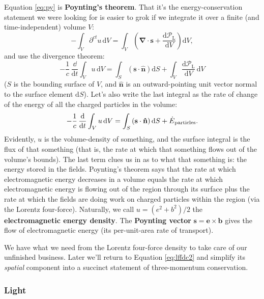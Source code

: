 \documentclass[12pt]{article}
\renewcommand{\vv}[1]{\mathbf{#1}}
\newcommand{\dd}[1]{\mathrm{d}#1}
\newcommand{\del}{\boldsymbol{\nabla}}
\begin{document}
Equation \ref{eq:py} is \textbf{Poynting's theorem}. That it's the energy-conservation statement we were looking for is easier to grok if we integrate it over a finite (and time-independent) volume $V$:
\begin{equation*}
- \int_V \partial^{ct} u \, \dd V = \int_V \left(  \del \cdot \vv s + \dfrac{\dd \mathcal{P}_{\textrm{L}}}{\dd V} \right) \dd V ,
\end{equation*}
and use the divergence theorem:
\begin{equation*}
- \dfrac{1}{c} \, \dfrac{\dd}{\dd t} \int_V u \, \dd V = \int_S \left( \vv s \cdot \vv{\hat{n}} \right) \dd S + \int_V \dfrac{\dd \mathcal{P}_{\textrm{L}}}{\dd V} \, \dd V
\end{equation*}
($S$ is the bounding surface of $V$, and $\vv{\hat{n}}$ is an outward-pointing unit vector normal to the surface element $\dd S$). Let's also write the last integral as the rate of change of the energy of all the charged particles in the volume:
\begin{equation*}
- \dfrac{1}{c} \, \dfrac{\dd}{\dd t} \int_V u \, \dd V = \int_S \left( \vv s \cdot \vv{\hat{n}} \right) \dd S + \dot{E}_{\mkern1mu \textrm{particles}} .
\end{equation*}
Evidently, $u$ is the volume-density of something, and the surface integral is the flux of that something (that is, the rate at which that something flows out of the volume's bounds). The last term clues us in as to what that something is: the energy stored in the fields. Poynting's theorem says that the rate at which electromagnetic energy decreases in a volume equals the rate at which electromagnetic energy is flowing out of the region through its surface plus the rate at which the fields are doing work on charged particles within the region (via the Lorentz four-force). Naturally, we call $u = (e^2 + b^2)/2$ the \textbf{electromagnetic energy density}. The \textbf{Poynting vector} $\vv s = \vv e \times \vv b$ gives the flow of electromagnetic energy (its per-unit-area rate of transport).

We have what we need from the Lorentz four-force density to take care of our unfinished business. Later we'll return to Equation \ref{eq:lffdc2} and simplify its \emph{spatial} component into a succinct statement of three-momentum conservation.


\subsubsection{Light}\label{sssec:li}
\end{document}

